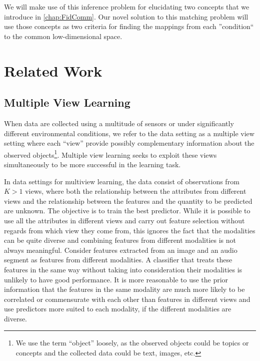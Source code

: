 \documentclass[12pt,oneside,final]{thesis}\usepackage[]{graphicx}\usepackage[]{color}
\begin{document}
We will make use of this inference problem for elucidating two concepts that we introduce  in \ref{chap:FidComm}. Our novel solution to this matching problem will use those concepts as two criteria for finding the mappings from each ''condition`` to the common low-dimensional space.




\chapter{Related Work}
\label{chap:RelatedWork}



\section{Multiple View Learning}
\label{sec:MultiViewLearn}
When data are collected using a multitude of sensors or under significantly different environmental conditions, we refer to  the data setting as a multiple view setting where each ``view'' provide possibly complementary  information about the observed objects\footnote{We use the term ``object''  loosely, as the observed objects could be topics or concepts and the  collected data could be text, images, etc.}. Multiple view learning seeks to exploit these views simultaneously to be more successful in the learning task.

In data settings for multiview learning, the data consist of observations from $K>1$ views, where both the relationship between the attributes from different views and the relationship between the features and the quantity to be predicted are unknown. The objective is to train the best predictor. While it is possible to use all the attributes in different views and carry out feature selection without regards from which view they come from, this ignores the fact that the modalities can be quite diverse and combining features from different modalities is not always meaningful. Consider features extracted from an image  and an audio segment as features from different modalities. A classifier that treats these features in the same way without taking into consideration their modalities is  unlikely to have good performance.
It is more reasonable to use the prior information that the features in the same modality are much more likely to be correlated or commensurate with each other than features in different views and use predictors more suited to each modality, if the different modalities are diverse.
\end{document}
